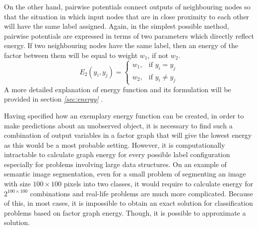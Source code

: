 On the other hand, pairwise potentials connect outputs of neighbouring nodes so that the situation in which input nodes that are in close proximity to each other will have the same label assigned. Again, in the simplest possible method, pairwise potentials are expressed in terms of two parameters which directly reflect energy. If two neighbouring nodes have the same label, then an energy of the factor between them will be equal to weight $w_1$, if not $w_2$.
\begin{equation}
    E_2(y_i,y_j)=\begin{cases}
     w_1, & \text{if }  y_i=y_j \\ 
     w_2, & \text{if } y_i \neq y_j
    \end{cases}
\end{equation}
A more detailed explanation of energy function and its formulation will be provided in section \textit{\ref{sec:energy} }.

Having specified how an exemplary energy function can be created, in order to make predictions about an unobserved object, it is necessary to find such a combination of output variables in a factor graph that will give the lowest energy as this would be a most probable setting. However, it is computationally intractable to calculate graph energy for every possible label configuration especially for problems involving large data structures. On an example of semantic image segmentation, even for a small problem of segmenting an image with size $100\times100$ pixels into two classes, it would require to calculate energy for $2^{100\times100}$ combinations and real-life problems are much more complicated. Because of this, in most cases, it is impossible to obtain an exact solution for classification problems based on factor graph energy. Though, it is possible to approximate a solution.